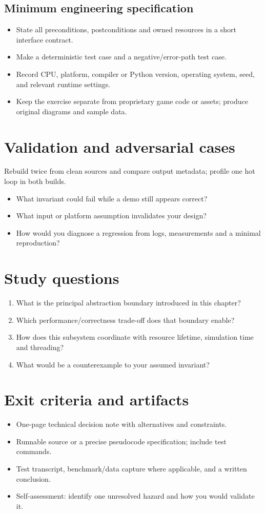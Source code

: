 \documentclass[11pt,letterpaper]{article}
\begin{document}
\subsection{Minimum engineering specification}
\begin{itemize}
\item State all preconditions, postconditions and owned resources in a short interface contract.
\item Make a deterministic test case and a negative/error-path test case.
\item Record CPU, platform, compiler or Python version, operating system, seed, and relevant runtime settings.
\item Keep the exercise separate from proprietary game code or assets; produce original diagrams and sample data.
\end{itemize}
\section{Validation and adversarial cases}
Rebuild twice from clean sources and compare output metadata; profile one hot loop in both builds.

\begin{itemize}
\item What invariant could fail while a demo still appears correct?
\item What input or platform assumption invalidates your design?
\item How would you diagnose a regression from logs, measurements and a minimal reproduction?
\end{itemize}
\section{Study questions}
\begin{enumerate}
\item What is the principal abstraction boundary introduced in this chapter?
\item Which performance/correctness trade-off does that boundary enable?
\item How does this subsystem coordinate with resource lifetime, simulation time and threading?
\item What would be a counterexample to your assumed invariant?
\end{enumerate}
\section{Exit criteria and artifacts}
\begin{itemize}
\item One-page technical decision note with alternatives and constraints.
\item Runnable source or a precise pseudocode specification; include test commands.
\item Test transcript, benchmark/data capture where applicable, and a written conclusion.
\item Self-assessment: identify one unresolved hazard and how you would validate it.
\end{itemize}
\end{document}
